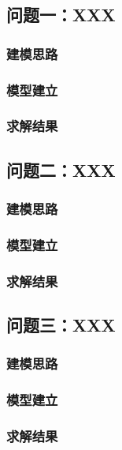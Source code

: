 \documentclass[12pt, a4paper]{article}
\begin{document}
\subsection{问题一：XXX}

\subsubsection{建模思路}

\subsubsection{模型建立}

\subsubsection{求解结果}

\subsection{问题二：XXX}

\subsubsection{建模思路}

\subsubsection{模型建立}

\subsubsection{求解结果}

\subsection{问题三：XXX}

\subsubsection{建模思路}

\subsubsection{模型建立}

\subsubsection{求解结果}
\end{document}
